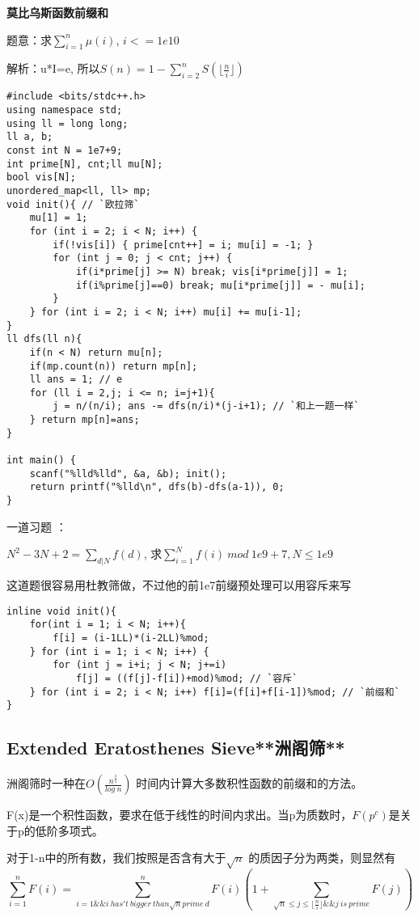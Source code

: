 {\bfseries 莫比乌斯函数前缀和}

题意：求$\sum_{i=1}^n \mu(i)$, $i <= 1e10$

解析：u*I=e, 所以$S(n) = 1 - \sum_{i=2}^n S(\lfloor \frac{n}{i} \rfloor )$

\begin{lstlisting}
#include <bits/stdc++.h>
using namespace std;
using ll = long long;
ll a, b;
const int N = 1e7+9;
int prime[N], cnt;ll mu[N];
bool vis[N];
unordered_map<ll, ll> mp;
void init(){ // `欧拉筛`
    mu[1] = 1;
    for (int i = 2; i < N; i++) {
        if(!vis[i]) { prime[cnt++] = i; mu[i] = -1; }
        for (int j = 0; j < cnt; j++) {
            if(i*prime[j] >= N) break; vis[i*prime[j]] = 1;
            if(i%prime[j]==0) break; mu[i*prime[j]] = - mu[i];
        }
    } for (int i = 2; i < N; i++) mu[i] += mu[i-1];
}
ll dfs(ll n){
    if(n < N) return mu[n];
    if(mp.count(n)) return mp[n];
    ll ans = 1; // e
    for (ll i = 2,j; i <= n; i=j+1){
        j = n/(n/i); ans -= dfs(n/i)*(j-i+1); // `和上一题一样`
    } return mp[n]=ans;
}

int main() {
    scanf("%lld%lld", &a, &b); init();
    return printf("%lld\n", dfs(b)-dfs(a-1)), 0;
}
\end{lstlisting}

一道习题 ：

$N^2-3N+2=\sum_{d|N} f(d)$, 求$\sum_{i=1}^Nf(i)\ mod \ 1e9+7, N \le 1e9$

这道题很容易用杜教筛做，不过他的前1e7前缀预处理可以用容斥来写

\begin{lstlisting}
inline void init(){
    for(int i = 1; i < N; i++){
        f[i] = (i-1LL)*(i-2LL)%mod;
    } for (int i = 1; i < N; i++) {
        for (int j = i+i; j < N; j+=i)
            f[j] = ((f[j]-f[i])+mod)%mod; // `容斥`
    } for (int i = 2; i < N; i++) f[i]=(f[i]+f[i-1])%mod; // `前缀和`
}
\end{lstlisting}

\subsection{Extended Eratosthenes Sieve**洲阁筛** }

洲阁筛时一种在$O(\frac{n^{\frac{3}{4}}}{log \ n})$ 时间内计算大多数积性函数的前缀和的方法。

F(x)是一个积性函数，要求在低于线性的时间内求出。当p为质数时，$F(p^c)$是关于p的低阶多项式。

对于1-n中的所有数，我们按照是否含有大于$\sqrt{n}$ 的质因子分为两类，则显然有
$$
\sum_{i=1}^n F(i) = \sum_{i=1 \&\& i \ has't \ bigger \ than \sqrt{n} prime \ d}^n F(i)(1 + \sum_{\sqrt{n}\le j \le \lfloor \frac{n}{i} \rfloor \& \& j\ is \ prime} F(j) )
$$

